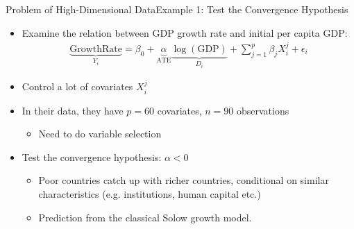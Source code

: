 \documentclass[dvipsnames,hyperref={pdfpagelabels=false}]{beamer}
\begin{document}
	
	\begin{frame}{Problem of High-Dimensional Data}{Example 1: Test the Convergence Hypothesis}
		\begin{itemize}
			\item Examine the relation between GDP growth rate and initial per capita GDP: 
			\begin{eqnarray*}
				\underbrace{\mbox{GrowthRate}}_{Y_{i}} = \beta_{0} + \underbrace{\alpha}_{\mbox{ATE}} \underbrace{\log(\mbox{GDP})}_{D_{i}}	+ \sum^{p}_{j=1} \beta_{j} X^{j}_{i} + \epsilon_{i}	
			\end{eqnarray*}
			
			\item Control a lot of covariates $X^{j}_{i}$	
			
			\item In their data, they have $p = 60$ covariates, $n = 90$
			observations 
			\vspace{0.2cm}
			\begin{itemize}
				\item Need to do variable selection
			\end{itemize}
			\vspace{0.2cm}
			\item Test the convergence hypothesis: $\alpha < 0$ 
			\vspace{0.2cm}
			\begin{itemize}
				\item Poor countries catch up with richer countries, conditional on similar characteristics (e.g. institutions, human capital etc.)
				
				
				\vspace{0.2cm}
				\item Prediction from the classical Solow growth model.   
			\end{itemize}
			
		\end{itemize}
	\end{frame}
	
\end{document}
